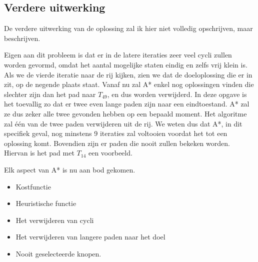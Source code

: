 \documentclass[alternative-exam.tex]{subfiles}
\begin{document}
\subsection{Verdere uitwerking}
De verdere uitwerking van de oplossing zal ik hier niet volledig opschrijven, maar beschrijven.

Eigen aan dit probleem is dat er in de latere iteraties zeer veel cycli zullen worden gevormd, omdat het aantal mogelijke staten eindig en zelfs vrij klein is.
Als we de vierde iteratie naar de rij kijken, zien we dat de doeloplossing die er in zit, op de negende plaats staat. Vanaf nu zal A* enkel nog oplossingen vinden die slechter zijn dan het pad naar $T_{49}$, en dus worden verwijderd. In deze opgave is het toevallig zo dat er twee even lange paden zijn naar een eindtoestand. A* zal ze dus zeker alle twee gevonden hebben op een bepaald moment. Het algoritme zal \'e\'en van de twee paden verwijderen uit de rij. We weten dus dat A*, in dit specifiek geval, nog minstens 9 iteraties zal voltooien voordat het tot een oplossing komt. Bovendien zijn er paden die nooit zullen bekeken worden. Hiervan is het pad met $T_{14}$ een voorbeeld.

Elk aspect van A* is nu aan bod gekomen.
\begin{itemize}
\item Kostfunctie
\item Heuristische functie
\item Het verwijderen van cycli
\item Het verwijderen van langere paden naar het doel
\item Nooit geselecteerde knopen.
\end{itemize}
\end{document}
